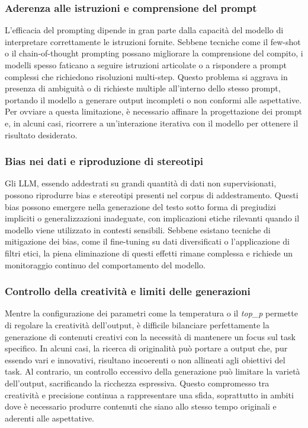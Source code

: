 \documentclass[target=mst,aauheader=,style=]{thud}
\begin{document}
\subsubsection{Aderenza alle istruzioni e comprensione del prompt}
L’efficacia del prompting dipende in gran parte dalla capacità del modello di interpretare correttamente le istruzioni fornite. Sebbene tecniche come il few-shot o il chain-of-thought prompting possano migliorare la comprensione del compito, i modelli spesso faticano a seguire istruzioni articolate o a rispondere a prompt complessi che richiedono risoluzioni multi-step. Questo problema si aggrava in presenza di ambiguità o di richieste multiple all'interno dello stesso prompt, portando il modello a generare output incompleti o non conformi alle aspettative. Per ovviare a questa limitazione, è necessario affinare la progettazione dei prompt e, in alcuni casi, ricorrere a un’interazione iterativa con il modello per ottenere il risultato desiderato.

\subsubsection{Bias nei dati e riproduzione di stereotipi}
Gli LLM, essendo addestrati su grandi quantità di dati non supervisionati, possono riprodurre bias e stereotipi presenti nel corpus di addestramento. Questi bias possono emergere nella generazione del testo sotto forma di pregiudizi impliciti o generalizzazioni inadeguate, con implicazioni etiche rilevanti quando il modello viene utilizzato in contesti sensibili. Sebbene esistano tecniche di mitigazione dei bias, come il fine-tuning su dati diversificati o l’applicazione di filtri etici, la piena eliminazione di questi effetti rimane complessa e richiede un monitoraggio continuo del comportamento del modello.

\subsubsection{Controllo della creatività e limiti delle generazioni}
Mentre la configurazione dei parametri come la temperatura o il \textit{top\_p} permette di regolare la creatività dell’output, è difficile bilanciare perfettamente la generazione di contenuti creativi con la necessità di mantenere un focus sul task specifico. In alcuni casi, la ricerca di originalità può portare a output che, pur essendo vari e innovativi, risultano incoerenti o non allineati agli obiettivi del task. Al contrario, un controllo eccessivo della generazione può limitare la varietà dell’output, sacrificando la ricchezza espressiva. Questo compromesso tra creatività e precisione continua a rappresentare una sfida, soprattutto in ambiti dove è necessario produrre contenuti che siano allo stesso tempo originali e aderenti alle aspettative.
\end{document}
